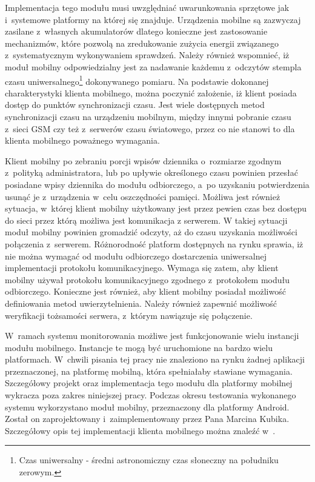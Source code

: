 Implementacja tego modułu musi uwzględniać uwarunkowania sprzętowe jak
i~systemowe platformy na której się znajduje. Urządzenia mobilne są
zazwyczaj zasilane z~własnych akumulatorów dlatego konieczne jest
zastosowanie mechanizmów, które pozwolą na zredukowanie zużycia
energii związanego z~systematycznym wykonywaniem sprawdzeń. Należy
również wspomnieć, iż moduł mobilny odpowiedzialny jest za nadawanie
każdemu z~odczytów stempla czasu uniwersalnego\footnote{Czas
  uniwersalny - średni astronomiczny czas słoneczny na południku
  zerowym.} dokonywanego pomiaru. Na podstawie dokonanej
charakterystyki klienta mobilnego, można poczynić założenie, iż klient
posiada dostęp do punktów synchronizacji czasu. Jest wiele dostępnych
metod synchronizacji czasu na urządzeniu mobilnym, między innymi
pobranie czasu z~sieci GSM czy też z~serwerów czasu światowego, przez
co nie stanowi to dla klienta mobilnego poważnego wymagania.

Klient mobilny po zebraniu porcji wpisów dziennika o~rozmiarze zgodnym
z~polityką administratora, lub po upływie określonego czasu powinien
przesłać posiadane wpisy dziennika do modułu odbiorczego, a~po
uzyskaniu potwierdzenia usunąć je z~urządzenia w~celu oszczędności
pamięci. Możliwa jest również sytuacja, w~której klient mobilny
użytkowany jest przez pewien czas bez dostępu do sieci przez którą
możliwa jest komunikacja z serwerem. W takiej sytuacji moduł mobilny
powinien gromadzić odczyty, aż do czasu uzyskania możliwości
połączenia z~serwerem. Różnorodność platform dostępnych na rynku
sprawia, iż nie można wymagać od modułu odbiorczego dostarczenia
uniwersalnej implementacji protokołu komunikacyjnego. Wymaga się
zatem, aby klient mobilny używał protokołu komunikacyjnego zgodnego
z~protokołem modułu odbiorczego. Konieczne jest również, aby klient
mobilny posiadał możliwość definiowania metod uwierzytelnienia. Należy
również zapewnić możliwość weryfikacji tożsamości serwera, z~którym
nawiązuje się połączenie.

W~ramach systemu monitorowania możliwe jest funkcjonowanie wielu
instancji modułu mobilnego. Instancje te mogą być uruchomione na
bardzo wielu platformach. W~chwili pisania tej pracy nie znaleziono na
rynku żadnej aplikacji przeznaczonej, na platformę mobilną, która
spełniałaby stawiane wymagania. Szczegółowy projekt oraz
implementacja tego modułu dla platformy mobilnej wykracza poza zakres
niniejszej pracy. Podczas okresu testowania wykonanego systemu
wykorzystano moduł mobilny, przeznaczony dla platformy Android. Został
on zaprojektowany i~zaimplementowany przez Pana Marcina
Kubika. Szczegółowy opis tej implementacji klienta mobilnego można
znaleźć w~\cite{book:pracaKubika}.

